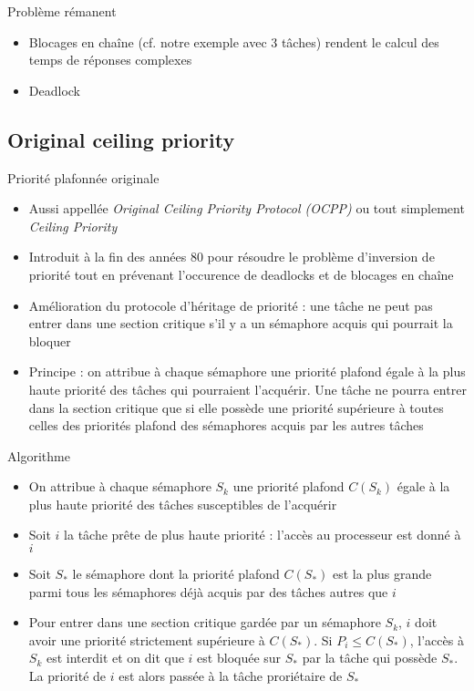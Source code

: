 \begin{frame}{Problème rémanent}
  \begin{itemize}
  \item Blocages en  chaîne (cf. notre exemple avec  3 tâches) rendent
    le calcul des temps de réponses complexes
  \item Deadlock
  \end{itemize}
\end{frame}

\subsection{Original ceiling priority}

\begin{frame}{Priorité plafonnée originale}
  \begin{itemize}
  \item  Aussi  appellée   \emph{Original  Ceiling  Priority  Protocol
      (OCPP)} ou tout simplement \emph{Ceiling Priority}
  \item Introduit  à la  fin des années  80 pour résoudre  le problème
    d'inversion de priorité tout en prévenant l'occurence de deadlocks
    et de blocages en chaîne
  \item Amélioration  du protocole d'héritage de priorité  : une tâche
    ne peut pas entrer dans une section critique s'il y a un sémaphore
    acquis qui pourrait la bloquer
  \item Principe : on attribue à chaque sémaphore une priorité plafond
    égale  à  la  plus   haute  priorité  des  tâches  qui  pourraient
    l'acquérir. Une  tâche ne pourra  entrer dans la  section critique
    que si  elle possède une  priorité supérieure à toutes  celles des
    priorités plafond des sémaphores acquis par les autres tâches
  \end{itemize}
\end{frame}

\begin{frame}{Algorithme}
  \begin{itemize}
  \item  On attribue  à chaque  sémaphore $S_k$  une  priorité plafond
    $C(S_k)$ égale à la plus haute priorité des tâches susceptibles de
    l'acquérir
  \item Soit  $i$ la tâche prête  de plus haute priorité  : l'accès au
    processeur est donné à $i$
  \item Soit $S_*$ le sémaphore  dont la priorité plafond $C(S_*)$ est
    la  plus grande  parmi tous  les  sémaphores déjà  acquis par  des
    tâches autres que $i$
  \item Pour entrer dans une  section critique gardée par un sémaphore
    $S_k$,  $i$  doit  avoir  une priorité  strictement  supérieure  à
    $C(S_*)$. Si  $P_i ≤ C(S_*)$, l'accès  à $S_k$ est  interdit et on
    dit  que  $i$ est  bloquée  sur $S_*$  par  la  tâche qui  possède
    $S_*$. La priorité de $i$  est alors passée à la tâche proriétaire
    de $S_*$
  \end{itemize}
\end{frame}

